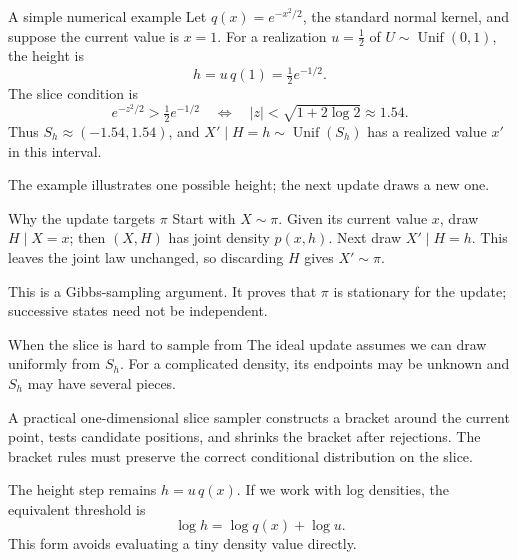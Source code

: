\documentclass[aspectratio=169,11pt]{beamer}
\begin{document}
\begin{frame}{A simple numerical example}
  Let \(q(x)=e^{-x^2/2}\), the standard normal kernel, and
  suppose the current value is \(x=1\).
  For a realization \(u=\tfrac12\) of \(U\sim \operatorname{Unif}(0,1)\),
  the height is
  \[
    h=u\,q(1)=\tfrac12 e^{-1/2}.
  \]
  The slice condition is
  \[
    e^{-z^2/2}>\tfrac12e^{-1/2}
    \quad\Longleftrightarrow\quad
    |z|<\sqrt{1+2\log 2}\approx 1.54.
  \]
  Thus \(S_h\approx(-1.54,1.54)\), and \(X'\mid H=h\sim \operatorname{Unif}(S_h)\)
  has a realized value \(x'\) in this interval.
  \vspace{0.45em}

  The example illustrates one possible height; the next update
  draws a new one.
\end{frame}

\begin{frame}{Why the update targets \(\pi\)}
  Start with \(X\sim\pi\). Given its current value \(x\), draw
  \(H\mid X=x\); then \((X,H)\) has joint density \(p(x,h)\).
  Next draw \(X'\mid H=h\). This leaves the joint law unchanged,
  so discarding \(H\) gives \(X'\sim\pi\).
  \vspace{0.75em}

  \alert{This is a Gibbs-sampling argument.} It proves that \(\pi\)
  is stationary for the update; successive states need not be
  independent.
\end{frame}

\begin{frame}{When the slice is hard to sample from}
  The ideal update assumes we can draw uniformly from \(S_h\).
  For a complicated density, its endpoints may be unknown and
  \(S_h\) may have several pieces.
  \vspace{0.55em}

  A practical one-dimensional slice sampler constructs a bracket
  around the current point, tests candidate positions, and shrinks
  the bracket after rejections. The bracket rules must preserve the
  correct conditional distribution on the slice.
  \vspace{0.65em}

  The height step remains \(h=u\,q(x)\). If we work with log densities,
  the equivalent threshold is
  \[
    \log h=\log q(x)+\log u.
  \]
  This form avoids evaluating a tiny density value directly.
\end{frame}
\end{document}
